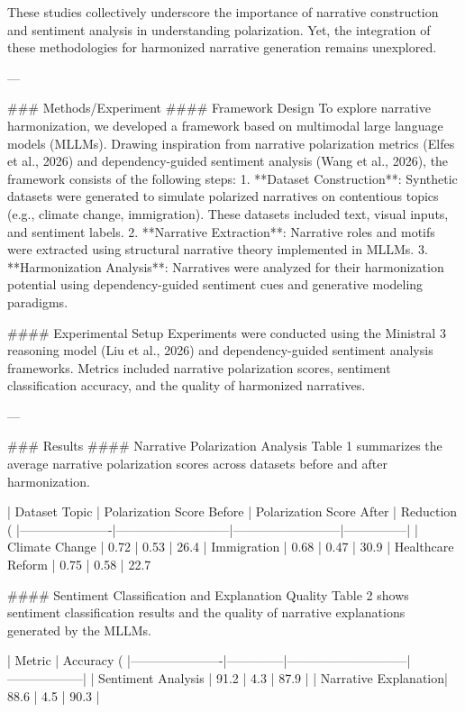 These studies collectively underscore the importance of narrative construction and sentiment analysis in understanding polarization. Yet, the integration of these methodologies for harmonized narrative generation remains unexplored.

---

### Methods/Experiment
#### Framework Design
To explore narrative harmonization, we developed a framework based on multimodal large language models (MLLMs). Drawing inspiration from narrative polarization metrics (Elfes et al., 2026) and dependency-guided sentiment analysis (Wang et al., 2026), the framework consists of the following steps:
1. **Dataset Construction**: Synthetic datasets were generated to simulate polarized narratives on contentious topics (e.g., climate change, immigration). These datasets included text, visual inputs, and sentiment labels.
2. **Narrative Extraction**: Narrative roles and motifs were extracted using structural narrative theory implemented in MLLMs.
3. **Harmonization Analysis**: Narratives were analyzed for their harmonization potential using dependency-guided sentiment cues and generative modeling paradigms.

#### Experimental Setup
Experiments were conducted using the Ministral 3 reasoning model (Liu et al., 2026) and dependency-guided sentiment analysis frameworks. Metrics included narrative polarization scores, sentiment classification accuracy, and the quality of harmonized narratives.

---

### Results
#### Narrative Polarization Analysis
Table 1 summarizes the average narrative polarization scores across datasets before and after harmonization.

| Dataset Topic        | Polarization Score Before | Polarization Score After | Reduction (%
|----------------------|---------------------------|--------------------------|---------------|
| Climate Change       | 0.72                      | 0.53                     | 26.4%
| Immigration          | 0.68                      | 0.47                     | 30.9%
| Healthcare Reform    | 0.75                      | 0.58                     | 22.7%

#### Sentiment Classification and Explanation Quality
Table 2 shows sentiment classification results and the quality of narrative explanations generated by the MLLMs.

| Metric               | Accuracy (%
|----------------------|--------------|-----------------------------|------------------|
| Sentiment Analysis   | 91.2         | 4.3                         | 87.9             |
| Narrative Explanation| 88.6         | 4.5                         | 90.3             |

